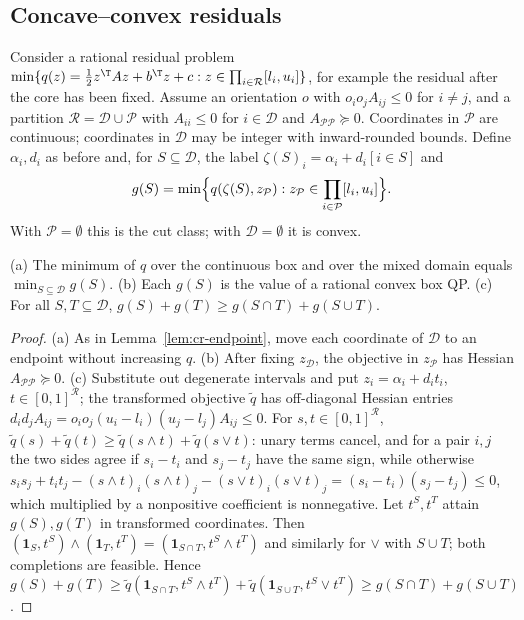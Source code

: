 \subsection{Concave--convex residuals}\label{sec:cr-mixed}

Consider a rational residual problem
$\min\{q(z)=\frac12z^{\T}Az+b^{\T}z+c : z\in\prod_{i\in\mathcal R}[l_i,u_i]\}$,
for example the residual after the core has been fixed. Assume an
orientation $o$ with $o_io_jA_{ij}\le0$ for $i\ne j$, and a partition
$\mathcal R=\mathcal D\cup\mathcal P$ with $A_{ii}\le0$ for $i\in\mathcal D$ and
$A_{\mathcal P\mathcal P}\succeq0$. Coordinates in $\mathcal P$ are
continuous; coordinates in $\mathcal D$ may be integer with inward-rounded
bounds. Define $\alpha_i,d_i$ as before and, for
$S\subseteq\mathcal D$, the label $\zeta(S)_i=\alpha_i+d_i[i\in S]$ and
\[
g(S)=\min\Bigl\{q(\zeta(S),z_{\mathcal P}) :
z_{\mathcal P}\in\prod_{i\in\mathcal P}[l_i,u_i]\Bigr\}.
\]
With $\mathcal P=\emptyset$ this is the cut class; with
$\mathcal D=\emptyset$ it is convex.

\begin{proposition}\label{prop:cr-submod}
(a) The minimum of $q$ over the continuous box and over the mixed domain
equals $\min_{S\subseteq\mathcal D}g(S)$.
(b) Each $g(S)$ is the value of a rational convex box QP.
(c) For all $S,T\subseteq\mathcal D$,
$g(S)+g(T)\ge g(S\cap T)+g(S\cup T)$.
\end{proposition}
\begin{proof}
(a) As in Lemma~\ref{lem:cr-endpoint}, move each coordinate of
$\mathcal D$ to an endpoint without increasing $q$. (b) After fixing
$z_{\mathcal D}$, the objective in $z_{\mathcal P}$ has Hessian
$A_{\mathcal P\mathcal P}\succeq0$. (c) Substitute out degenerate intervals
and put $z_i=\alpha_i+d_it_i$, $t\in[0,1]^{\mathcal R}$; the transformed objective
$\tilde q$ has off-diagonal Hessian entries
$d_id_jA_{ij}=o_io_j(u_i-l_i)(u_j-l_j)A_{ij}\le0$. For $s,t\in[0,1]^{\mathcal R}$,
$\tilde q(s)+\tilde q(t)\ge\tilde q(s\wedge t)+\tilde q(s\vee t)$: unary terms
cancel, and for a pair $i,j$ the two sides agree if $s_i-t_i$ and
$s_j-t_j$ have the same sign, while otherwise
$s_is_j+t_it_j-(s\wedge t)_i(s\wedge t)_j-(s\vee t)_i(s\vee t)_j
=(s_i-t_i)(s_j-t_j)\le0$, which multiplied by a nonpositive coefficient is
nonnegative. Let $t^S,t^T$ attain $g(S),g(T)$ in transformed
coordinates. Then $(\mathbf 1_S,t^S)\wedge(\mathbf 1_T,t^T)
=(\mathbf 1_{S\cap T},t^S\wedge t^T)$ and similarly for $\vee$ with
$S\cup T$; both completions are feasible. Hence
$g(S)+g(T)\ge\tilde q(\mathbf 1_{S\cap T},t^S\wedge t^T)
+\tilde q(\mathbf 1_{S\cup T},t^S\vee t^T)\ge g(S\cap T)+g(S\cup T)$.
\end{proof}

